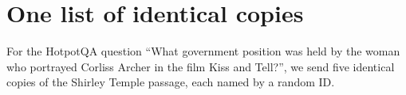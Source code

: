 \section{One list of identical copies}
\label{app:lists}
For the HotpotQA question ``What government position was held by the woman who portrayed Corliss Archer in the film Kiss and Tell?'', we send five identical copies of the Shirley Temple passage, each named by a random ID.

\begin{table}[H]
\caption{Probability of each copy in one run, in the order sent. The highest and the lowest probability of each model are in bold, and \emph{Gap} is the highest minus the lowest, in percentage points.}
\label{tab:copies-one}
\centering
\resizebox{\linewidth}{!}{%
}
\end{table}
